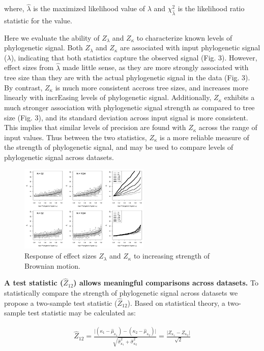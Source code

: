 \documentclass[9pt,twocolumn,twoside,lineno]{pnas-new}
\begin{document}
where, \(\hat{\lambda}\) is the maximized likelihood value of
\(\lambda\) and \(\chi^{2}_{\hat{\lambda}}\) is the likelihood ratio
statistic for the value.

Here we evaluate the ability of \(Z_{\lambda}\) and \(Z_{\kappa}\) to
characterize known levels of phylogenetic signal. Both \(Z_{\lambda}\)
and \(Z_{\kappa}\) are associated with input phylogenetic signal
(\(\lambda\)), indicating that both statistics capture the observed
signal (Fig. 3). However, effect sizes from \(\hat{\lambda}\) made
little sense, as they are more strongly associated with tree size than
they are with the actual phylogenetic signal in the data (Fig. 3). By
contrast, \(Z_{\kappa}\) is much more consistent accross tree sizes, and
increases more linearly with incrEasing levels of phylogenetic signal.
Additionally, \(Z_{\kappa}\) exhibits a much stronger association with
phylogenetic signal strength as compared to tree size (Fig. 3), and its
standard deviation across input signal is more consistent. This implies
that similar levels of precision are found with \(Z_{\kappa}\) across
the range of input values. Thus between the two statistics,
\(Z_{\kappa}\) is a more reliable measure of the strength of
phylogenetic signal, and may be used to compare levels of phylogenetic
signal across datasets.

\begin{figure}
\centering
\includegraphics{fig.3.png}
\caption{Response of effect sizes \(Z_{\lambda}\) and \(Z_{\kappa}\) to
increasing strength of Brownian motion.{}}
\end{figure}

\textbf{A test statistic (\(\hat{Z}_{12}\)) allows meaningful
comparisons across datasets.} To statistically compare the strength of
phylogenetic signal across datasets we propose a two-sample test
statistic (\(\hat{Z}_{12}\)). Based on statistical theory, a two-sample
test statistic may be calculated as:

\begin{align}
  \hat{Z}_{12}=\frac{\lvert{(\kappa_{1}-\hat\mu_{\kappa_1})-(\kappa_{2}-\hat\mu_{\kappa_2})}\rvert}{\sqrt{\hat\sigma^2_{\kappa_1}+\hat\sigma^2_{\kappa_2}}} = \frac{\lvert Z_{\kappa_1} - Z_{\kappa_2}\rvert}{\sqrt{2}}
\end{align}
\end{document}
